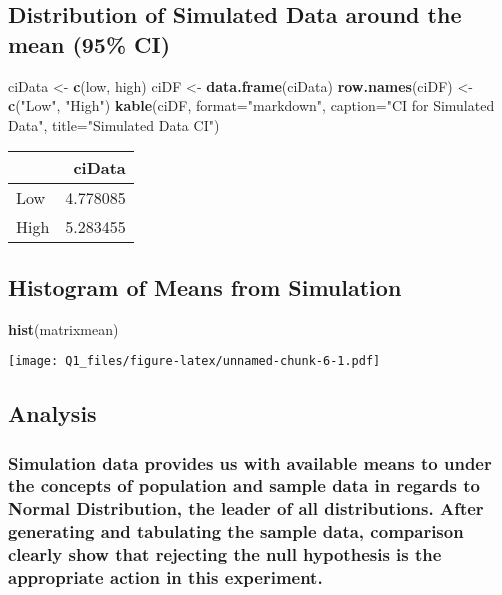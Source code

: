 \documentclass[]{article}
\newenvironment{Shaded}{\begin{snugshade}}{\end{snugshade}}
\newcommand{\KeywordTok}[1]{\textcolor[rgb]{0.13,0.29,0.53}{\textbf{#1}}}
\newcommand{\DataTypeTok}[1]{\textcolor[rgb]{0.13,0.29,0.53}{#1}}
\newcommand{\StringTok}[1]{\textcolor[rgb]{0.31,0.60,0.02}{#1}}
\newcommand{\NormalTok}[1]{#1}
\begin{document}
\subsection{Distribution of Simulated Data around the mean (95\%
CI)}\label{distribution-of-simulated-data-around-the-mean-95-ci}

\begin{Shaded}
\begin{Highlighting}[]
\NormalTok{ciData <-}\StringTok{ }\KeywordTok{c}\NormalTok{(low, high)}
\NormalTok{ciDF <-}\StringTok{ }\KeywordTok{data.frame}\NormalTok{(ciData)}
\KeywordTok{row.names}\NormalTok{(ciDF) <-}\StringTok{ }\KeywordTok{c}\NormalTok{(}\StringTok{"Low"}\NormalTok{, }\StringTok{"High"}\NormalTok{)}
\KeywordTok{kable}\NormalTok{(ciDF, }\DataTypeTok{format=}\StringTok{"markdown"}\NormalTok{, }\DataTypeTok{caption=}\StringTok{"CI for Simulated Data"}\NormalTok{, }\DataTypeTok{title=}\StringTok{"Simulated Data CI"}\NormalTok{)}
\end{Highlighting}
\end{Shaded}

\begin{longtable}[]{@{}lr@{}}
\toprule
& ciData\tabularnewline
\midrule
\endhead
Low & 4.778085\tabularnewline
High & 5.283455\tabularnewline
\bottomrule
\end{longtable}

\subsection{Histogram of Means from
Simulation}\label{histogram-of-means-from-simulation}

\begin{Shaded}
\begin{Highlighting}[]
\KeywordTok{hist}\NormalTok{(matrixmean)}
\end{Highlighting}
\end{Shaded}

\texttt{[image: Q1\_files/figure-latex/unnamed-chunk-6-1.pdf]}

\subsection{Analysis}\label{analysis}

\subsubsection{Simulation data provides us with available means to under
the concepts of population and sample data in regards to Normal
Distribution, the leader of all distributions. After generating and
tabulating the sample data, comparison clearly show that rejecting the
null hypothesis is the appropriate action in this
experiment.}\label{simulation-data-provides-us-with-available-means-to-under-the-concepts-of-population-and-sample-data-in-regards-to-normal-distribution-the-leader-of-all-distributions.-after-generating-and-tabulating-the-sample-data-comparison-clearly-show-that-rejecting-the-null-hypothesis-is-the-appropriate-action-in-this-experiment.}
\end{document}
